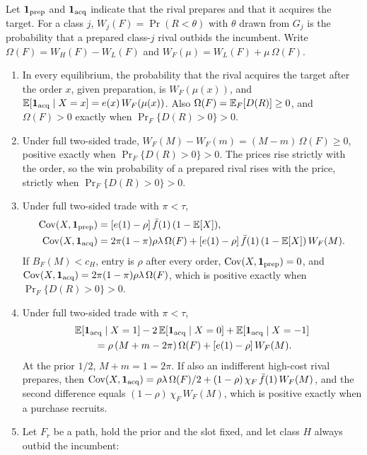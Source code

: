 Let \(\mathbf{1}_{\rm prep}\) and \(\mathbf{1}_{\rm acq}\) indicate that the rival prepares and that it acquires the target. For
a class \(j\), \(W_j(F)=\Pr(R<\theta)\) with \(\theta\) drawn from \(G_j\) is the probability that a prepared
class-\(j\) rival outbids the incumbent. Write \(\Omega(F)=W_H(F)-W_L(F)\) and \(W_F(\mu)=W_L(F)+\mu\,\Omega(F)\).

\begin{proposition}\label{prop:winner}
\leavevmode
\begin{enumerate}[label=(\roman*),leftmargin=2em]
\item In every equilibrium, the probability that the rival acquires the target after the order \(x\), given
preparation, is \(W_F(\mu(x))\), and \(\mathbb{E}[\mathbf{1}_{\rm acq}\mid X=x]=e(x)\,W_F(\mu(x))\). Also
\(\Omega(F)=\mathbb{E}_F[D(R)]\ge0\), and \(\Omega(F)>0\) exactly when \(\Pr_F\{D(R)>0\}>0\).
\item Under full two-sided trade, \(W_F(M)-W_F(m)=(M-m)\,\Omega(F)\ge0\), positive exactly when
\(\Pr_F\{D(R)>0\}>0\). The prices rise strictly with the order, so the win probability of a prepared rival
rises with the price, strictly when \(\Pr_F\{D(R)>0\}>0\).
\item Under full two-sided trade with \(\pi<\tau\),
\[
\begin{aligned}
\operatorname{Cov}(X,\mathbf{1}_{\rm prep})&=[e(1)-\rho]\,\bar f(1)\,(1-\mathbb{E}[X]),\\
\operatorname{Cov}(X,\mathbf{1}_{\rm acq})&=2\pi(1-\pi)\rho\lambda\,\Omega(F)+[e(1)-\rho]\,\bar f(1)\,(1-\mathbb{E}[X])\,W_F(M).
\end{aligned}
\]
If \(B_F(M)<c_H\), entry is \(\rho\) after every order, \(\operatorname{Cov}(X,\mathbf{1}_{\rm prep})=0\), and
\(\operatorname{Cov}(X,\mathbf{1}_{\rm acq})=2\pi(1-\pi)\rho\lambda\,\Omega(F)\), which is positive exactly when \(\Pr_F\{D(R)>0\}>0\).
\item Under full two-sided trade with \(\pi<\tau\),
\[
\begin{aligned}
&\mathbb{E}[\mathbf{1}_{\rm acq}\mid X=1]-2\,\mathbb{E}[\mathbf{1}_{\rm acq}\mid X=0]+\mathbb{E}[\mathbf{1}_{\rm acq}\mid X=-1]\\
&\qquad=\rho\,(M+m-2\pi)\,\Omega(F)+[e(1)-\rho]\,W_F(M).
\end{aligned}
\]
At the prior \(1/2\), \(M+m=1=2\pi\). If also an indifferent high-cost rival prepares, then
\(\operatorname{Cov}(X,\mathbf{1}_{\rm acq})=\rho\lambda\,\Omega(F)/2+(1-\rho)\,\chi_F\,\bar f(1)\,W_F(M)\), and the second difference
equals \((1-\rho)\,\chi_F\,W_F(M)\), which is positive exactly when a purchase recruits.
\item Let \(F_r\) be a path, hold the prior and the slot fixed, and let class \(H\) always outbid the incumbent:

\end{enumerate}
\end{proposition}
